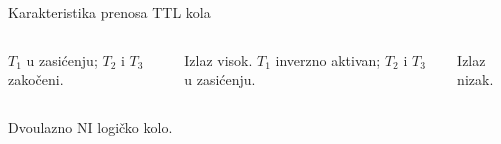 \begin{frame}[label=10-s057]{Karakteristika prenosa TTL kola}
\setlength{\abovedisplayskip}{4pt}\setlength{\belowdisplayskip}{4pt}\setlength{\abovedisplayshortskip}{3pt}\setlength{\belowdisplayshortskip}{3pt}
\begin{columns}[T,onlytextwidth]\centering \end{columns}\smallskip
\begin{columns}[T,onlytextwidth]\smallskip
$T_1$ u zasićenju; $T_2$ i $T_3$ zakočeni.\par Izlaz visok.
\smallskip
$T_1$ inverzno aktivan; $T_2$ i $T_3$ u zasićenju.\par Izlaz nizak.
\end{columns}\smallskip\centering Dvoulazno NI logičko kolo.
\end{frame}
